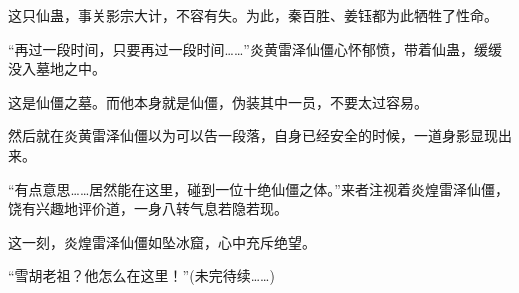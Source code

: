 \begin{this_body}
这只仙蛊，事关影宗大计，不容有失。为此，秦百胜、姜钰都为此牺牲了性命。

“再过一段时间，只要再过一段时间……”炎黄雷泽仙僵心怀郁愤，带着仙蛊，缓缓没入墓地之中。

这是仙僵之墓。而他本身就是仙僵，伪装其中一员，不要太过容易。

然后就在炎黄雷泽仙僵以为可以告一段落，自身已经安全的时候，一道身影显现出来。

“有点意思……居然能在这里，碰到一位十绝仙僵之体。”来者注视着炎煌雷泽仙僵，饶有兴趣地评价道，一身八转气息若隐若现。

这一刻，炎煌雷泽仙僵如坠冰窟，心中充斥绝望。

“雪胡老祖？他怎么在这里！”(未完待续……)

\end{this_body}

